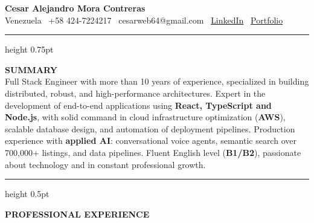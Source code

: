 \documentclass[11pt]{article}
\begin{document}
\begin{center}
    \textbf{\Huge Cesar Alejandro Mora Contreras}\\
    \vspace{3pt}
    \small Venezuela \textbullet \ +58 424-7224217 \textbullet \ cesarweb64@gmail.com \textbullet \ \href{https://linkedin.com/in/cesar-alejandro-mora-contreras-0118a51bb}{LinkedIn} \textbullet \ \href{https://cesarmc-port.github.io/portfolio}{Portfolio}
\end{center}

\vspace{-6pt}
\hrule height 0.75pt
\vspace{4pt}

\textbf{SUMMARY} \\
Full Stack Engineer with more than 10 years of experience, specialized in building distributed, robust, and high-performance architectures. Expert in the development of end-to-end applications using \textbf{React, TypeScript and Node.js}, with solid command in cloud infrastructure optimization (\textbf{AWS}), scalable database design, and automation of deployment pipelines. Production experience with \textbf{applied AI}: conversational voice agents, semantic search over 700,000+ listings, and data pipelines. Fluent English level (\textbf{B1/B2}), passionate about technology and in constant professional growth.

\vspace{5pt}
\hrule height 0.5pt
\vspace{4pt}

\textbf{PROFESSIONAL EXPERIENCE} \\
\end{document}
